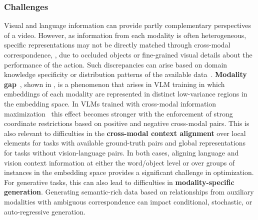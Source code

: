 \subsubsection{Challenges}
\label{sec:recognition::language:::challenges}

Visual and language information can provide partly complementary perspectives of a video. However, as information from each modality is often heterogeneous, specific representations may not be directly matched through cross-modal correspondence, \eg, due to occluded objects or fine-grained visual details about the performance of the action. Such discrepancies can arise based on domain knowledge specificity or distribution patterns of the available data~. \textbf{Modality gap}~, shown in , is a phenomenon that arises in VLM training in which embeddings of each modality are represented in distinct low-variance regions in the embedding space. In VLMs trained with cross-modal information maximization~ this effect becomes stronger with the enforcement of strong coordinate restrictions based on positive and negative cross-modal pairs. This is also relevant to difficulties in the \textbf{cross-modal context alignment} over local elements for tasks with available ground-truth pairs and global representations for tasks without vision-language pairs. In both cases, aligning language and vision context information at either the word/object level or over groups of instances in the embedding space provides a significant challenge in optimization. For generative tasks, this can also lead to difficulties in \textbf{modality-specific generation}. Generating semantic-rich data based on relationships from auxiliary modalities with ambiguous correspondence can impact conditional, stochastic, or auto-regressive generation.

